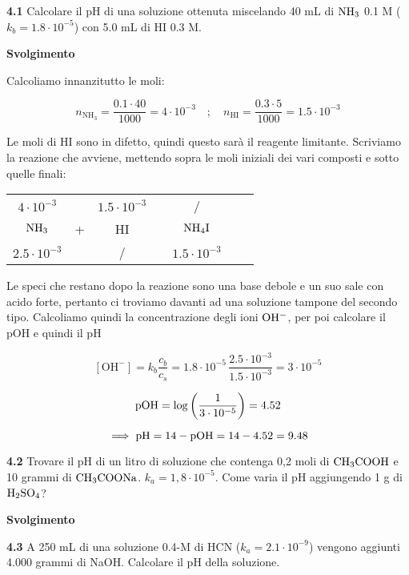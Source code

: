 \textbf{4.1} Calcolare il pH di una soluzione ottenuta miscelando 40 mL di $\rm NH_3$ 0.1 M ($k_b = 1.8 \cdot 10^{-5}$) con 5.0 mL di HI 0.3 M.

\vspace{0.2cm}\large\textbf{Svolgimento}\normalsize

\vspace{0.2cm}Calcoliamo innanzitutto le moli:

$$n_{\text{NH}_3}=\frac{0.1 \cdot 40}{1000}=4 \cdot 10^{-3}
\quad ; \quad
n_{\text{HI}}=\frac{0.3 \cdot 5}{1000}=1.5 \cdot 10^{-3}$$

Le moli di HI sono in difetto, quindi questo sarà il reagente limitante. Scriviamo la reazione che avviene, mettendo sopra le moli iniziali dei vari composti e sotto quelle finali:

\begin{center}
    \begin{tabular}{ccccccc}
        $4 \cdot 10^{-3}$ &  & $1.5 \cdot 10^{-3}$ & & /\\
        $\rm NH_3$ & + & HI & \ce{->} & $\rm NH_4I$ \\
        $2.5 \cdot 10^{-3}$ &  &  / & & $1.5 \cdot 10^{-3}$\\
    \end{tabular}
\end{center}

Le speci che restano dopo la reazione sono una base debole e un suo sale con acido forte, pertanto ci troviamo davanti ad una soluzione tampone del secondo tipo. Calcoliamo quindi la concentrazione degli ioni $\rm OH^-$, per poi calcolare il pOH e quindi il pH

$$[\text{OH}^-]=k_b\frac{c_b}{c_s}
=1.8 \cdot 10^{-5}\,\frac{2.5 \cdot 10^{-3}}{1.5 \cdot 10^{-3}}= 3 \cdot 10^{-5}$$

$$\rm pOH=\log\left(\frac{1}{3 \cdot 10^{-5}}\right)=4.52$$

$$\implies \rm pH=14-pOH=14-4.52=9.48$$

\vspace{0.2cm}\textbf{4.2} Trovare il pH di un litro di soluzione che contenga 0,2 moli di $\rm CH_3COOH$ e 10 grammi di $\rm CH_3COONa$. $k_a = 1,8 \cdot 10^{-5}$. Come varia il pH aggiungendo 1 g di $\rm H_2SO_4$?

\large\textbf{Svolgimento}\normalsize

\vspace{0.2cm}

\vspace{0.2cm}\textbf{4.3} A 250 mL di una soluzione 0.4-M di HCN ($k_a = 2.1 \cdot 10^{-9}$) vengono aggiunti 4.000 grammi di NaOH. Calcolare il pH della soluzione.

